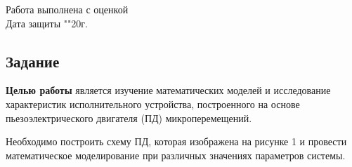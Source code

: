 \documentclass[a4paper, 12pt]{article}
\begin{document}
\begin{titlepage}
		Работа выполнена с оценкой \hspace{1cm} \underline{\hspace{8cm}} \\ 
		\vspace{1cm}
		Дата защиты "\underline{\hspace{0.7cm}}"\hspace{0.2cm}\underline{\hspace{2cm}}\hspace{0.2cm}20\underline{\hspace{0.7cm}}г.
		
	\end{titlepage}

\begin{center}
\section*{Задание}
\end{center} \par
\textbf{Целью работы} является изучение математических моделей и исследование характеристик исполнительного устройства, построенного на основе пьезоэлектрического двигателя (ПД) микроперемещений. \par
Необходимо построить схему ПД, которая изображена на рисунке 1 и провести математическое моделирование при различных значениях параметров системы.
\end{document}
